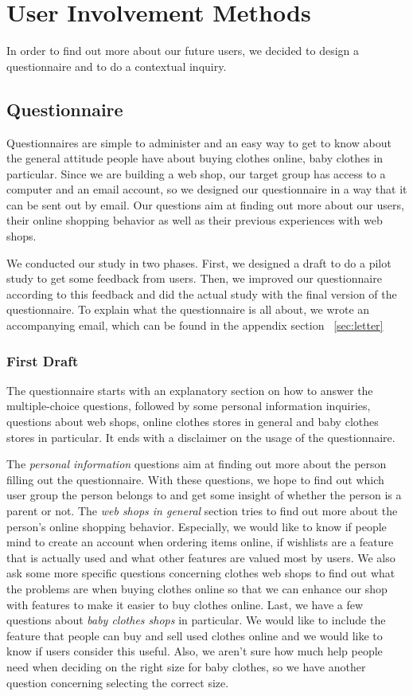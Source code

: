 \section{User Involvement Methods}
In order to find out more about our future users, we decided to design a questionnaire and to do a contextual inquiry. 

\subsection{Questionnaire}
Questionnaires are simple to administer and an easy way to get to know about the general attitude people have about buying clothes online, baby clothes in particular. Since we are building a web shop, our target group has access to a computer and an email account, so we designed our questionnaire in a way that it can be sent out by email. Our questions aim at finding out more about our users, their online shopping behavior as well as their previous experiences with web shops. 

We conducted our study in two phases. First, we designed a draft to do a pilot study to get some feedback from users. Then, we improved our questionnaire according to this feedback and did the actual study with the final version of the questionnaire. To explain what the questionnaire is all about, we wrote an accompanying email, which can be found in the appendix section ~\ref{sec:letter}

\subsubsection{First Draft}
The questionnaire starts with an explanatory section on how to answer the multiple-choice questions, followed by some personal information inquiries, questions about web shops, online clothes stores in general and baby clothes stores in particular. It ends with a disclaimer on the usage of the questionnaire.

The \textit{personal information} questions aim at finding out more about the person filling out the questionnaire. With these questions, we hope to find out which user group the person belongs to and get some insight of whether the person is a parent or not. The \textit{web shops in general} section tries to find out more about the person's online shopping behavior. Especially, we would like to know if people mind to create an account when ordering items online, if wishlists are a feature that is actually used and what other features are valued most by users.
We also ask some more specific questions concerning clothes web shops to find out what the problems are when buying clothes online so that we can enhance our shop with features to make it easier to buy clothes online. 
Last, we have a few questions about \textit{baby clothes shops} in particular. We would like to include the feature that people can buy and sell used clothes online and we would like to know if users consider this useful. Also, we aren't sure how much help people need when deciding on the right size for baby clothes, so we have another question concerning selecting the correct size.

